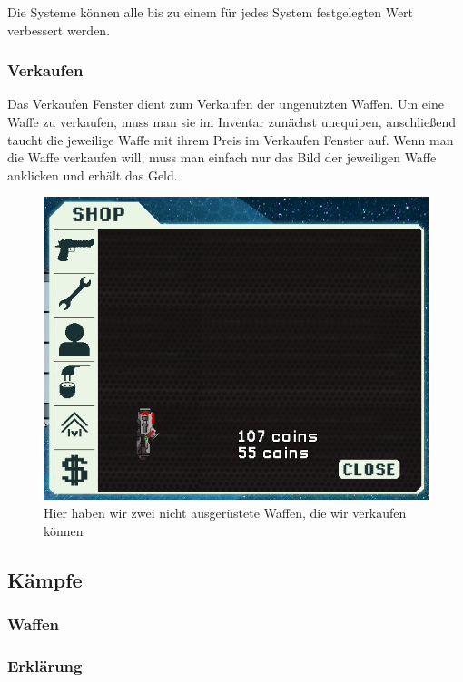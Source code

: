 \documentclass[fontsize=12pt,paper=a4,twoside]{scrartcl}
\begin{document}
Die Systeme können alle bis zu einem für jedes System festgelegten Wert verbessert werden. 

\subsubsection{Verkaufen}

Das Verkaufen Fenster dient zum Verkaufen der ungenutzten Waffen. Um eine Waffe zu verkaufen, muss man sie im Inventar zunächst unequipen, anschließend taucht die jeweilige Waffe mit ihrem Preis im Verkaufen Fenster auf. Wenn man die Waffe verkaufen will, muss man einfach nur das Bild der jeweiligen Waffe anklicken und erhält das Geld. 

\begin{figure}[H]
\centering
\includegraphics[width=1\linewidth]{DasSpiel/Shop/sell.png}
\caption{Hier haben wir zwei nicht ausgerüstete Waffen, die wir verkaufen können}
\end{figure}

\subsection{Kämpfe}



\subsubsection{Waffen}

\subsubsection{Erklärung}
\end{document}
